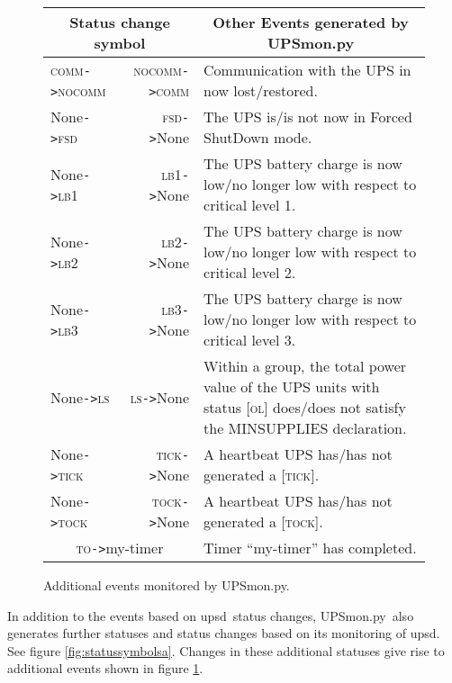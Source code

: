\documentclass[12pt]{article}
\newcommand{\upsd}{\mbox{\textcolor{UPSDCOLOUR}{upsd}}}
\newcommand{\UPSmon}{\mbox{\textcolor{UPSMONCOLOUR}{UPSmon.py}}}
\newcommand{\LBi}{\textcolor{MONCOLOUR}{\textsc{lb1}}}
\newcommand{\LBii}{\textcolor{MONCOLOUR}{\textsc{lb2}}}
\newcommand{\LBiii}{\textcolor{MONCOLOUR}{\textsc{lb3}}}
\newcommand{\OL}{\textcolor{UPSDCOLOUR}{\textsc{ol}}}
\newcommand{\NOCOMM}{\textcolor{MONCOLOUR}{\textsc{nocomm}}}
\newcommand{\COMM}{\textcolor{UPSMONCOLOUR}{\textsc{comm}}}
\newcommand{\FSD}{\textcolor{UPSMONCOLOUR}{\textsc{fsd}}}
\newcommand{\LS}{\textcolor{UPSMONCOLOUR}{\textsc{ls}}}
\newcommand{\None}{\textcolor{UPSMONCOLOUR}{\textsf{None}}}
\newcommand{\TICK}{\textcolor{UPSMONCOLOUR}{\textsc{tick}}}
\newcommand{\TO}{\textcolor{UPSMONCOLOUR}{\textsc{to}}}
\newcommand{\TOCK}{\textcolor{UPSMONCOLOUR}{\textsc{tock}}}
\newcommand{\status}[1]{\textcolor{UPSDCOLOUR}{[{#1}]}}
\newcommand{\EVENT}[2]{\textcolor{MONCOLOUR}{#1}{\allowbreak}\texttt{\textcolor{MONCOLOUR}{->}}{\allowbreak}\textcolor{MONCOLOUR}{#2}}
\begin{document}
\begin{figure}[ht]
\begin{center}
\begin{tabular}{|l|r|p{0.65\LinePrinterwidth}|}
\hline
\multicolumn{2}{|c|}{\textbf{Status change symbol}} & \multicolumn{1}{c|}{\textbf{Other Events generated by \UPSmon}} \\ \hline\hline
\EVENT{\COMM}{\NOCOMM}  & \EVENT{\NOCOMM}{\COMM}    & Communication with the UPS in now lost/restored. \\ \hline
\EVENT{\None}{\FSD}     & \EVENT{\FSD}{\None}       & The UPS is/is not now in Forced ShutDown mode. \\ \hline
\EVENT{\None}{\LBi}     & \EVENT{\LBi}{\None}       & The UPS battery charge is now low/no longer 
                                                      low with respect to critical level 1. \\ \hline
\EVENT{\None}{\LBii}    & \EVENT{\LBii}{\None}      & The UPS battery charge is now low/no longer 
                                                      low with respect to critical level 2. \\ \hline
\EVENT{\None}{\LBiii}   & \EVENT{\LBiii}{\None}     & The UPS battery charge is now low/no longer
                                                      low with respect to critical level 3. \\ \hline
\EVENT{\None}{\LS}      & \EVENT{\LS}{\None}        & Within a group, the total power value of the UPS units
                                                      with status \status{\OL} does/does not
                                                      satisfy the MINSUPPLIES declaration. \\ \hline
\EVENT{\None}{\TICK}    & \EVENT{\TICK}{\None}      & A heartbeat UPS has/has not generated a \status{\TICK}. \\ \hline
\EVENT{\None}{\TOCK}    & \EVENT{\TOCK}{\None}      & A heartbeat UPS has/has not generated a \status{\TOCK}. \\ \hline
\multicolumn{2}{|c|}{\EVENT{\TO}{my-timer}}         & Timer ``my-timer'' has completed. \\ \hline
\end{tabular}
\caption{Additional events monitored by \UPSmon.\label{fig:UPSmonEVENTa}}
\end{center}
\end{figure}

In addition to the events based on \upsd\ status changes, \UPSmon\ also
generates further statuses and status changes based on its monitoring of
\upsd.  See figure \ref{fig:statussymbolsa}.  Changes in these additional
statuses give rise to additional events shown in figure
\ref{fig:UPSmonEVENTa}.
\end{document}
